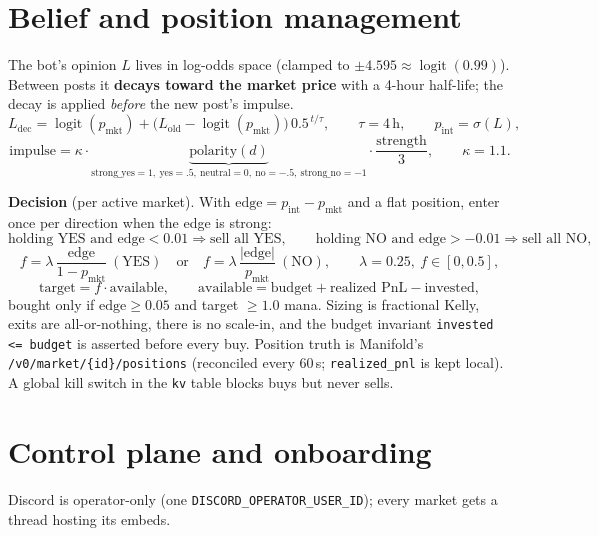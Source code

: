 \documentclass[10pt,a4paper]{article}
\newcommand{\pint}{p_{\mathrm{int}}}
\newcommand{\pmkt}{p_{\mathrm{mkt}}}
\newcommand{\logit}{\operatorname{logit}}
\begin{document}
\section{Belief and position management}\label{sec:belief}

The bot's opinion $L$ lives in log-odds space (clamped to $\pm 4.595 \approx
\logit(0.99)$). Between posts it \textbf{decays toward the market price} with
a 4-hour half-life; the decay is applied \emph{before} the new post's impulse.
\[
L_{\mathrm{dec}} = \logit(\pmkt) + \bigl(L_{\mathrm{old}} - \logit(\pmkt)\bigr)\, 0.5^{\,t/\tau},
\qquad \tau = {4\,\text{h}},
\qquad \pint = \sigma(L),
\]
\[
\text{impulse} = \kappa \cdot \underbrace{\text{polarity}(d)}_{\text{strong\_yes}=1,\ \text{yes}=.5,\ \text{neutral}=0,\ \text{no}=-.5,\ \text{strong\_no}=-1}
\cdot \frac{\text{strength}}{3},
\qquad \kappa = 1.1 .
\]

\textbf{Decision} (per active market). With $\text{edge} = \pint - \pmkt$ and a
flat position, enter once per direction when the edge is strong:
\[
\text{holding YES and }\text{edge} < 0.01 \Rightarrow \text{sell all YES}, \qquad
\text{holding NO and }\text{edge} > -0.01 \Rightarrow \text{sell all NO},
\]
\[
f = \lambda\,\frac{\text{edge}}{1-\pmkt}\ (\text{YES}) \quad\text{or}\quad
f = \lambda\,\frac{|\text{edge}|}{\pmkt}\ (\text{NO}),\qquad
\lambda = 0.25,\ f \in [0, 0.5],
\]
\[
\text{target} = f \cdot \text{available}, \qquad
\text{available} = \text{budget} + \text{realized PnL} - \text{invested},
\]
bought only if $\text{edge} \ge 0.05$ and target $\ge 1.0$ mana. Sizing is
fractional Kelly, exits are all-or-nothing, there is no scale-in, and the
budget invariant \texttt{invested <= budget} is asserted before every buy.
Position truth is Manifold's \texttt{/v0/market/\{id\}/positions} (reconciled
every 60\,s; \texttt{realized\_pnl} is kept local). A global kill switch in
the \texttt{kv} table blocks buys but never sells.

\section{Control plane and onboarding}\label{sec:discord}

Discord is operator-only (one \texttt{DISCORD\_OPERATOR\_USER\_ID}); every
market gets a thread hosting its embeds.
\end{document}
